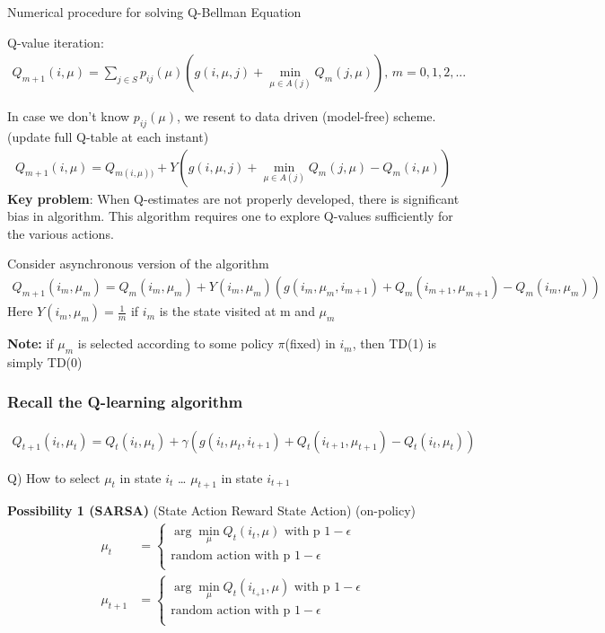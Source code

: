 \documentclass[11pt]{article}
\begin{document}
Numerical procedure for solving Q-Bellman Equation

Q-value iteration:
\begin{align*}
Q_{m+1}(i, \mu) = \sum_{j \in S} p_{ij}(\mu) (g(i, \mu, j) + \min_{\mu \in A(j)}Q_m(j, \mu)) \text{, $m = 0, 1, 2, ...$}
\end{align*}

In case we don't know \(p_{ij}(\mu)\), we resent to data driven (model-free) scheme. (update full Q-table at each instant)
\begin{align*}
 Q_{m+1}(i, \mu) = Q_{m(i, \mu))} + Y (g(i, \mu, j) + \min_{\mu \in A(j)} Q_m(j, \mu) - Q_m(i, \mu))
\end{align*}
\textbf{Key problem}:
When Q-estimates are not properly developed, there is significant bias in algorithm.
This algorithm requires one to explore Q-values sufficiently for the various actions.

Consider asynchronous version of the algorithm
\begin{align*}
Q_{m+1}(i_m, \mu_m) = Q_m(i_m, \mu_m) + Y(i_m, \mu_m) (g(i_m, \mu_m, i_{m+1}) + Q_m(i_{m+1}, \mu_{m+1}) - Q_m(i_m, \mu_m))
\end{align*}
Here \(Y(i_m, \mu_m) = \frac{1}{m}\) if \(i_m\) is the state visited at m and \(\mu_m\)

\textbf{Note:} if \(\mu_m\) is selected according to some policy \(\pi\)(fixed) in \(i_m\), then TD(1) is simply TD(0)

\subsubsection{Recall the Q-learning algorithm}
\label{sec:org08e2017}
\begin{align*}
Q_{t+1}(i_t, \mu_t) = Q_t(i_t, \mu_t) + \gamma (g(i_t, \mu_t, i_{t+1}) + Q_t(i_{t+1}, \mu_{t+1}) - Q_t(i_t, \mu_t))
\end{align*}

Q) How to select \(\mu_t\) in state \(i_t\) \ldots{} \(\mu_{t+1}\) in state \(i_{t+1}\)

\textbf{Possibility 1 (SARSA)} (State Action Reward State Action) (on-policy)
\begin{align*}
\mu_t &=
  \begin{cases}
    \arg\min_{\mu} Q_t(i_t, \mu) \text{ with p } 1-\epsilon \\
    \text{random action} \text{ with p } 1-\epsilon \\
  \end{cases} \\
\mu_{t+1} &=
  \begin{cases}
    \arg\min_{\mu} Q_t(i_{t_+1}, \mu) \text{ with p } 1-\epsilon \\
    \text{random action} \text{ with p } 1-\epsilon \\
  \end{cases}
\end{align*}
\end{document}
